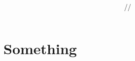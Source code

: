 \documentclass[a4paper,12pt]{article}
\title{\texttt{}\\\hrulefill}
\author{}
\date{\small{//}}
\begin{document}
    \maketitle

    \section{Something}
\end{document}
